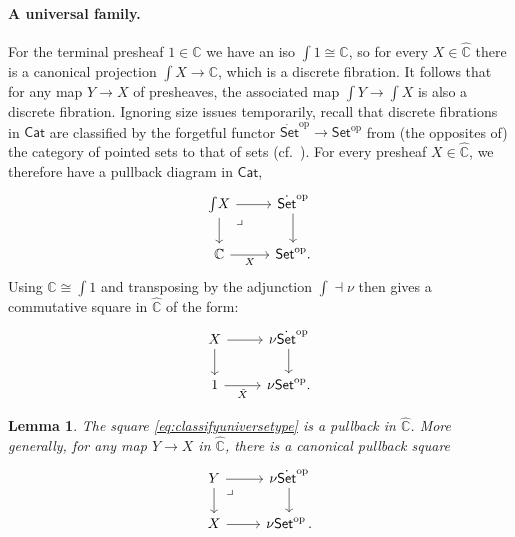 \documentclass[11pt]{amsart}
\newcommand{\bbC}{\ensuremath{\mathbb{C}}}
\newcommand{\Set}{\ensuremath{\mathsf{Set}}}
\newcommand{\Cat}{\ensuremath{\mathsf{Cat}}}
\newcommand{\op}[1]{\ensuremath{{#1}^{\mathrm{op}}}}
\newcommand{\ra}{\ensuremath{\rightarrow}}
\renewcommand{\to}{\ensuremath{\rightarrow}}
\newcommand{\elem}[1]{\textstyle\int\!{#1}}%
\newtheorem{lemma}[theorem]{Lemma}
\theoremstyle{remark}
\theoremstyle{definition}
\newcommand{\pbmark}{\ar[dr, phantom, "\lrcorner" very near start, shift right=.5ex]}	%
\begin{document}
\paragraph{A universal family.}

For the terminal presheaf $1\in\widehat{\bbC}$ we have an iso $\elem{1} \cong\bbC$, so for every $X\in\widehat{\bbC}$ there is a canonical projection  $\elem X \ra\bbC$, which is a discrete fibration.  It follows that for any map $Y\to X$ of presheaves, the associated map $\elem Y \to \elem X$ is also a discrete fibration. 
Ignoring size issues temporarily, recall that discrete fibrations in $\Cat$ are classified by the forgetful functor $\op{\dot{\Set}}\to \op{\Set}$ from (the opposites of) the category of pointed sets to that of sets (cf.~\cite{W:2007}).  For every presheaf $X\in\widehat{\bbC}$, we therefore have a pullback diagram in $\Cat$,
\begin{equation}\label{eq:classifyuniversecat}\textstyle
\begin{tikzcd}
	 \elem X \ar[d] \ar[r] \pbmark & \op{\dot{\Set}} \ar[d]\\  
	\bbC \ar[r,swap,"X"] &  \op{\Set}.
 \end{tikzcd}
 \end{equation}
Using $\bbC\cong\elem{1}$ and transposing by the adjunction $\int \dashv \nu$ then gives a commutative square in $\widehat{\bbC}$ of the form:
\begin{equation}\label{eq:classifyuniversetype}\textstyle
\begin{tikzcd}
	 X \ar[d] \ar[r] & \nu\op{\dot{\Set}} \ar[d]\\  
	1 \ar[r,swap,"\tilde{X}"] &  \nu\op{\Set}.
 \end{tikzcd}
 \end{equation}

\begin{lemma}
The square \eqref{eq:classifyuniversetype} is a pullback in $\widehat{\bbC}$. More generally, for any map $Y\ra X$ in $\widehat{\bbC}$, there is a canonical pullback square 
\begin{equation}\label{eq:classifyuniversefamily}\textstyle
\begin{tikzcd}
	 Y \ar[d] \pbmark \ar[r] & \nu\op{\dot{\Set}} \ar[d] \\  
	X \ar[r] &  \nu\op{\Set}\,.
 \end{tikzcd}
 \end{equation}
\end{lemma}
\end{document}
